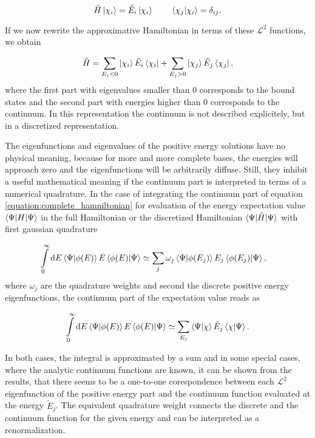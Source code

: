 \begin{equation}
  \tilde{H} \ket{\chi_i} = \tilde{E}_i \ket{\chi_i} \quad\quad  \,
  \braket{\chi_j|\chi_i} = \delta_{ij} .
\end{equation}

If we now rewrite the approximative Hamiltonian in terms of these $\mathcal{L}^2$
functions, we obtain

\begin{equation}
  \tilde{H} = \sum\limits_{E_i<0} \ket{\chi_i} \tilde{E}_i \bra{\chi_i}
            + \sum\limits_{E_j>0} \ket{\chi_j} \tilde{E}_j \bra{\chi_j}   ,
\end{equation}
where the first part with eigenvalues smaller than 0 corresponds to the
bound states and the second part with energies higher than 0 corresponds to
the continuum. In this representation the continuum is not described explicitely,
but in a discretized representation.

The eigenfunctions and eigenvalues of the positive energy solutions have no physical
meaning, because for more and more complete bases, the energies will approach zero
and the eigenfunctions will be arbitrarily diffuse. Still, they inhibit a useful
mathematical meaning if the continuum part is interpreted in terms of
a numerical quadrature.
In the case of integrating the continuum part of equation
\ref{equation:complete_hamniltonian} for evaluation of the energy expectation
value $\braket{\Psi| H | \Psi}$ in the full Hamiltonian or the discretized Hamiltonian
$\braket{\Psi| \tilde{H} | \Psi}$
with first gaussian quadrature 


\begin{align}
  \int\limits_0^\infty \mathrm{d}E \braket{\Psi|\phi(E)} E \braket{\phi(E)|\Psi}
  &\simeq \sum\limits_j \omega_j \braket{\Psi|\phi(E_j)} E_j \braket{\phi(E_j)|\Psi} ,
\end{align}
where  $\omega_j$ are the quadrature weights and second the discrete positive energy
eigenfunctions, the continuum part of the expectation value reads as


\begin{equation}
  \int\limits_0^\infty \mathrm{d}E \braket{\Psi|\phi(E)} E \braket{\phi(E)|\Psi}
  \simeq \sum\limits_{E_j}  \braket{\Psi|\chi} \tilde{E}_j \braket{\chi|\Psi}   .
\end{equation}

In both cases, the integral is approximated by a sum and in some special cases, where
the analytic continuum functions are known, it can be shown from the results,
that there seems to be a one-to-one corespondence between each $\mathcal{L}^2$
eigenfunction of the positive energy part and the continuum function evaluated
at the energy $\tilde{E}_j$. The equivalent quadrature weight connects the discrete and
the continuum function for the given energy and can be interpreted as a renormalization.

